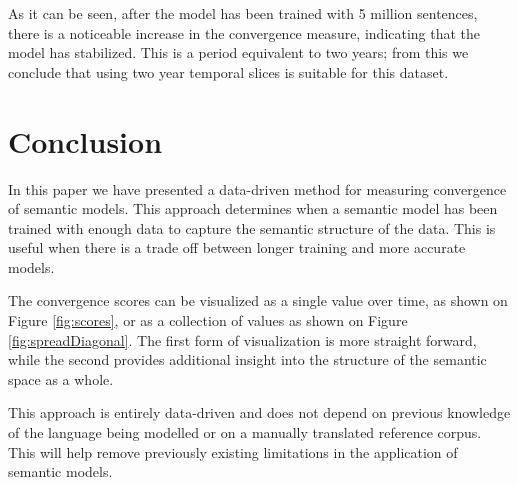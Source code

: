 \documentclass{article} %
\begin{document}
As it can be seen, after the model has been trained with 5 million sentences, there is a noticeable increase in the convergence measure, indicating that the model has stabilized. This is a period equivalent to two years; from this we conclude that using two year temporal slices is suitable for this dataset.

\section{Conclusion}
\label{sec:conclusion}
In this paper we have presented a data-driven method for measuring convergence of semantic models. This approach determines when a semantic model has been trained with enough data to capture the semantic structure of the data. This is useful when there is a trade off between longer training and more accurate models.

The convergence scores can be visualized as a single value over time, as shown on Figure \ref{fig:scores}, or as a collection of values as shown on Figure \ref{fig:spreadDiagonal}. The first form of visualization is more straight forward, while the second provides additional insight into the structure of the semantic space as a whole.

This approach is entirely data-driven and does not depend on previous knowledge of the language being modelled or on a manually translated reference corpus. This will help remove previously existing limitations in the application of semantic models.
\end{document}
